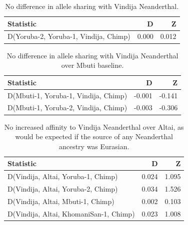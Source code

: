 \documentclass{article}
\begin{document}
\begin{table}[ht]
\centering
\begin{tabular}{lrr}
  \hline
Statistic & D & Z \\ 
  \hline
D(Yoruba-2, Yoruba-1, Vindija, Chimp) & 0.000 & 0.012 \\ 
   \hline
\end{tabular}
\caption{No difference in allele sharing with Vindija Neanderthal.} 
\label{dstats:a4}
\end{table}
\begin{table}[ht]
\centering
\begin{tabular}{lrr}
  \hline
Statistic & D & Z \\ 
  \hline
D(Mbuti-1, Yoruba-1, Vindija, Chimp) & -0.001 & -0.141 \\ 
  D(Mbuti-1, Yoruba-2, Vindija, Chimp) & -0.003 & -0.306 \\ 
   \hline
\end{tabular}
\caption{No difference in allele sharing with Vindija Neanderthal over Mbuti baseline.} 
\label{dstats:a5}
\end{table}
\begin{table}[ht]
\centering
\begin{tabular}{lrr}
  \hline
Statistic & D & Z \\ 
  \hline
D(Vindija, Altai, Yoruba-1, Chimp) & 0.024 & 1.095 \\ 
  D(Vindija, Altai, Yoruba-2, Chimp) & 0.034 & 1.526 \\ 
  D(Vindija, Altai, Mbuti-1, Chimp) & 0.002 & 0.103 \\ 
  D(Vindija, Altai, KhomaniSan-1, Chimp) & 0.023 & 1.008 \\ 
   \hline
\end{tabular}
\caption{No increased affinity to Vindija Neanderthal over Altai, as would be expected if the source of any Neanderthal ancestry was Eurasian.} 
\label{dstats:a6}
\end{table}
\end{document}
